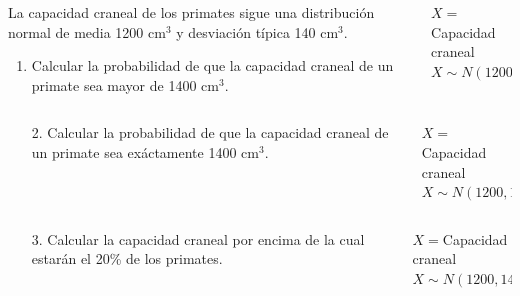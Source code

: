 \documentclass[aspectratio=169,10pt,t]{beamer}
\begin{document}
\begin{frame}
\begin{columns}
\begin{column}[T]{0.7\textwidth}
La capacidad craneal de los primates sigue una distribución normal de media 1200 cm$^3$ y desviación típica 140 cm$^3$.

\begin{enumerate}
\item Calcular la probabilidad de que la capacidad craneal de un primate sea mayor de 1400 cm$^3$.
\end{enumerate}
\end{column}
\quad
\begin{column}[T]{0.3\textwidth}
\begin{datos}
$X=$Capacidad craneal\\
$X\sim N(1200, 140)$
\end{datos}
\end{column}
\end{columns}
\end{frame}


\begin{frame}
\begin{columns}
\begin{column}[T]{0.7\textwidth}
\begin{enumerate}
\item[2.] Calcular la probabilidad de que la capacidad craneal de un primate sea exáctamente 1400 cm$^3$.
\end{enumerate}
\end{column}
\begin{column}[T]{0.3\textwidth}
\begin{datos}
$X=$Capacidad craneal\\
$X\sim N(1200, 140)$
\end{datos}
\end{column}
\end{columns}
\end{frame}

\begin{frame}
\begin{columns}
\begin{column}[T]{0.7\textwidth}
\begin{enumerate}
\item[3.] Calcular la capacidad craneal por encima de la cual estarán el 20\% de los primates.
\end{enumerate}
\end{column}
\begin{column}[T]{0.3\textwidth}
\begin{datos}
$X=$Capacidad craneal\\
$X\sim N(1200, 140)$
\end{datos}
\end{column}
\end{columns}
\end{frame}
\end{document}
